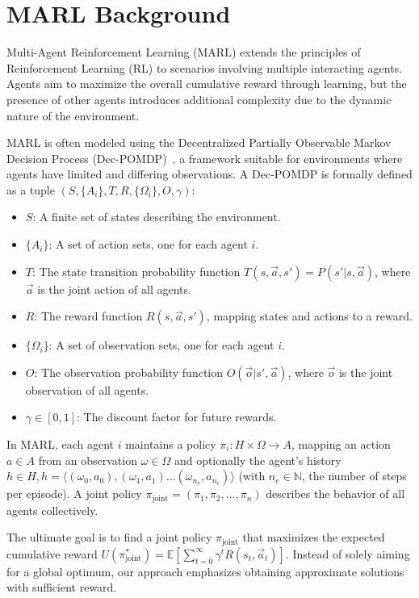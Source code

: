 \section{MARL Background}\label{sec:marl_background}

Multi-Agent Reinforcement Learning (MARL) extends the principles of Reinforcement Learning (RL) to scenarios involving multiple interacting agents. Agents aim to maximize the overall cumulative reward through learning, but the presence of other agents introduces additional complexity due to the dynamic nature of the environment.

MARL is often modeled using the Decentralized Partially Observable Markov Decision Process (Dec-POMDP)~\cite{Beynier2013}, a framework suitable for environments where agents have limited and differing observations. A Dec-POMDP is formally defined as a tuple $(S, \{A_i\}, T, R, \{\Omega_i\}, O, \gamma)$:

\begin{itemize}
  \item $S$: A finite set of states describing the environment.
  \item $\{A_i\}$: A set of action sets, one for each agent $i$.
  \item $T$: The state transition probability function $T(s, \vec{a}, s') = P(s'|s, \vec{a})$, where $\vec{a}$ is the joint action of all agents.
  \item $R$: The reward function $R(s, \vec{a}, s')$, mapping states and actions to a reward.
  \item $\{\Omega_i\}$: A set of observation sets, one for each agent $i$.
  \item $O$: The observation probability function $O(\vec{o} | s', \vec{a})$, where $\vec{o}$ is the joint observation of all agents.
  \item $\gamma \in [0,1]$: The discount factor for future rewards.
\end{itemize}

In MARL, each agent $i$ maintains a policy $\pi_i: H \times \Omega \rightarrow A$, mapping an action $a \in A$ from an observation $\omega \in \Omega$ and optionally the agent's history $h \in H, h=\langle(\omega_0,a_0),(\omega_1,a_1)\dots(\omega_{n_e},a_{n_e})\rangle$ (with $n_e \in \mathbb{N}$, the number of steps per episode). A joint policy $\pi_{\text{joint}} = (\pi_1, \pi_2, \ldots, \pi_n)$ describes the behavior of all agents collectively.

The ultimate goal is to find a joint policy $\pi_{\text{joint}}$ that maximizes the expected cumulative reward $U(\pi^*_{\text{joint}}) = \mathbb{E}\left[\sum_{t=0}^{\infty} \gamma^t R(s_t, \vec{a}_t)\right]$. Instead of solely aiming for a global optimum, our approach emphasizes obtaining approximate solutions with sufficient reward.

